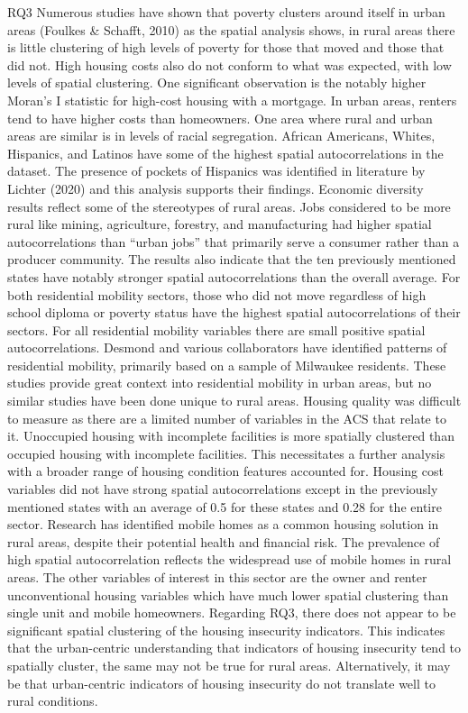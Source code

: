 RQ3 Numerous studies have shown that poverty clusters around itself in urban areas (Foulkes \& Schafft, 2010) as the spatial analysis shows, in rural areas there is little clustering of high levels of poverty for those that moved and those that did not. High housing costs also do not conform to what was expected, with low levels of spatial clustering. One significant observation is the notably higher Moran’s I statistic for high-cost housing with a mortgage. In urban areas, renters tend to have higher costs than homeowners. One area where rural and urban areas are similar is in levels of racial segregation. African Americans, Whites, Hispanics, and Latinos have some of the highest spatial autocorrelations in the dataset. The presence of pockets of Hispanics was identified in literature by Lichter (2020) and this analysis supports their findings. Economic diversity results reflect some of the stereotypes of rural areas.  Jobs considered to be more rural like mining, agriculture, forestry, and manufacturing had higher spatial autocorrelations than “urban jobs” that primarily serve a consumer rather than a producer community. The results also indicate that the ten previously mentioned states have notably stronger spatial autocorrelations than the overall average. For both residential mobility sectors, those who did not move regardless of high school diploma or poverty status have the highest spatial autocorrelations of their sectors. For all residential mobility variables there are small positive spatial autocorrelations. Desmond and various collaborators have identified patterns of residential mobility, primarily based on a sample of Milwaukee residents. These studies provide great context into residential mobility in urban areas, but no similar studies have been done unique to rural areas. Housing quality was difficult to measure as there are a limited number of variables in the ACS that relate to it. Unoccupied housing with incomplete facilities is more spatially clustered than occupied housing with incomplete facilities. This necessitates a further analysis with a broader range of housing condition features accounted for. Housing cost variables did not have strong spatial autocorrelations except in the previously mentioned states with an average of 0.5 for these states and 0.28 for the entire sector. Research has identified mobile homes as a common housing solution in rural areas, despite their potential health and financial risk. The prevalence of high spatial autocorrelation reflects the widespread use of mobile homes in rural areas. The other variables of interest in this sector are the owner and renter unconventional housing variables which have much lower spatial clustering than single unit and mobile homeowners. Regarding RQ3, there does not appear to be significant spatial clustering of the housing insecurity indicators. This indicates that the urban-centric understanding that indicators of housing insecurity tend to spatially cluster, the same may not be true for rural areas. Alternatively, it may be that urban-centric indicators of housing insecurity do not translate well to rural conditions.  

